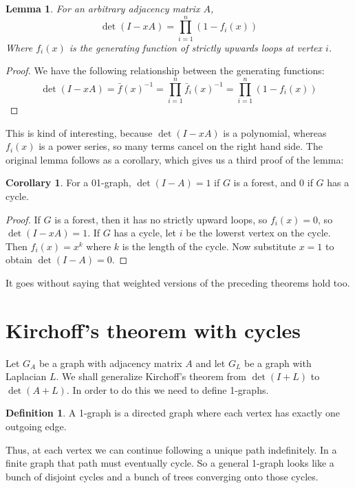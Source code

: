 \documentclass[a4paper, 11pt]{article}
\newtheorem{lemma}[theorem]{Lemma}
\theoremstyle{definition}
\newtheorem{definition}{Definition}[section]
\newtheorem{corollary}{Corollary}[theorem]
\begin{document}
\begin{lemma} For an arbitrary adjacency matrix $A$,
  \[ \det(I - xA) = \prod_{i = 1}^n (1 - f_i(x)) \]
  Where $f_i(x)$ is the generating function of strictly upwards loops at vertex $i$.
\end{lemma}
\begin{proof}
  We have the following relationship between the generating functions:
  \[
    \det(I - xA) = \bar{f}(x)^{-1} = \prod_{i=1}^n \bar{f}_i(x)^{-1} = \prod_{i=1}^n (1 - f_i(x))
  \]
\end{proof}

This is kind of interesting, because $\det(I - xA)$ is a polynomial, whereas $f_i(x)$ is a power series, so many terms cancel on the right hand side. The original lemma follows as a corollary, which gives us a third proof of the lemma:

\begin{corollary}
  For a 01-graph, $\det(I-A)=1$ if $G$ is a forest, and $0$ if $G$ has a cycle.
\end{corollary}
\begin{proof}
  If $G$ is a forest, then it has no strictly upward loops, so $f_i(x) = 0$, so $\det(I - xA) = 1$. If $G$ has a cycle, let $i$ be the lowerst vertex on the cycle. Then $f_i(x) = x^k$ where $k$ is the length of the cycle. Now substitute $x = 1$ to obtain $\det(I - A) = 0$.
\end{proof}

It goes without saying that weighted versions of the preceding theorems hold too.

\section{Kirchoff's theorem with cycles}

Let $G_A$ be a graph with adjacency matrix $A$ and let $G_L$ be a graph with Laplacian $L$. We shall generalize Kirchoff's theorem from $\det(I + L)$ to $\det(A + L)$. In order to do this we need to define 1-graphs.

\begin{definition}
  A 1-graph is a directed graph where each vertex has exactly one outgoing edge.
\end{definition}

Thus, at each vertex we can continue following a unique path indefinitely. In a finite graph that path must eventually cycle. So a general 1-graph looks like a bunch of disjoint cycles and a bunch of trees converging onto those cycles.
\end{document}
